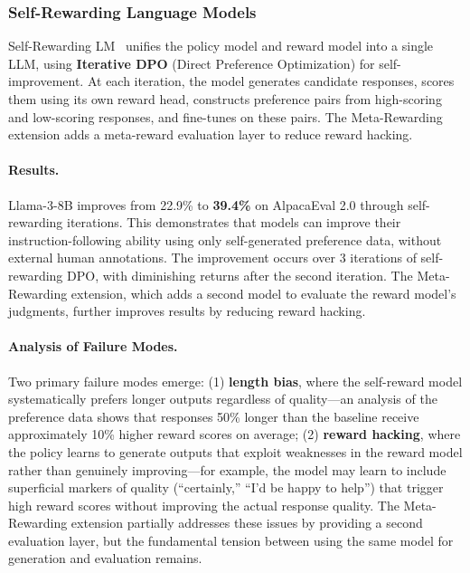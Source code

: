 \subsubsection{Self-Rewarding Language Models}

Self-Rewarding LM~\citep{selfrewarding2024} unifies the policy model and reward model into a single LLM, using \textbf{Iterative DPO} (Direct Preference Optimization) for self-improvement. At each iteration, the model generates candidate responses, scores them using its own reward head, constructs preference pairs from high-scoring and low-scoring responses, and fine-tunes on these pairs. The Meta-Rewarding extension adds a meta-reward evaluation layer to reduce reward hacking.

\paragraph{Results.}
Llama-3-8B improves from 22.9\% to \textbf{39.4\%} on AlpacaEval 2.0 through self-rewarding iterations. This demonstrates that models can improve their instruction-following ability using only self-generated preference data, without external human annotations. The improvement occurs over 3 iterations of self-rewarding DPO, with diminishing returns after the second iteration. The Meta-Rewarding extension, which adds a second model to evaluate the reward model's judgments, further improves results by reducing reward hacking.

\paragraph{Analysis of Failure Modes.}
Two primary failure modes emerge: (1) \textbf{length bias}, where the self-reward model systematically prefers longer outputs regardless of quality---an analysis of the preference data shows that responses 50\% longer than the baseline receive approximately 10\% higher reward scores on average; (2) \textbf{reward hacking}, where the policy learns to generate outputs that exploit weaknesses in the reward model rather than genuinely improving---for example, the model may learn to include superficial markers of quality (``certainly,'' ``I'd be happy to help'') that trigger high reward scores without improving the actual response quality. The Meta-Rewarding extension partially addresses these issues by providing a second evaluation layer, but the fundamental tension between using the same model for generation and evaluation remains.

